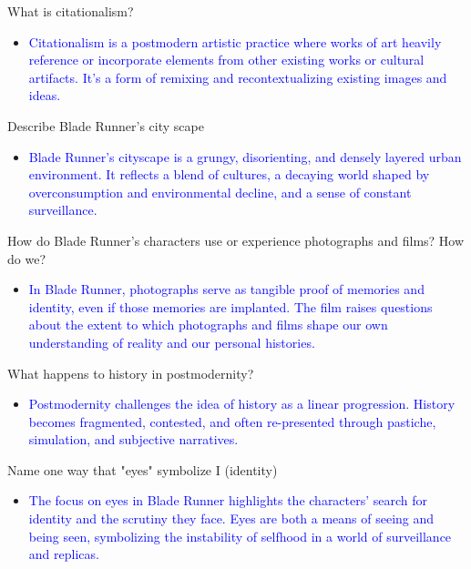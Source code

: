 \documentclass[11pt,fleqn]{book}
\begin{document}
\begin{exercise}
What is citationalism?
\begin{itemize}
    \item \textcolor{blue}{Citationalism is a postmodern artistic practice where works of art heavily reference or incorporate elements from other existing works or cultural artifacts. It's a form of remixing and recontextualizing existing images and ideas.}
\end{itemize}
\end{exercise}

\begin{exercise}
Describe Blade Runner's city scape
\begin{itemize}
\item \textcolor{blue}{Blade Runner's cityscape is a grungy, disorienting, and densely layered urban environment. It reflects a blend of cultures,  a decaying world shaped by overconsumption and environmental decline, and a sense of constant surveillance. }
\end{itemize}
\end{exercise}

\begin{exercise}
How do Blade Runner's characters use or experience photographs and films? How do we?
\begin{itemize}
\item \textcolor{blue}{In Blade Runner, photographs serve as tangible proof of memories and identity, even if those memories are implanted. The film raises questions about the extent to which photographs and films shape our own understanding of reality and our personal histories. }
\end{itemize}
\end{exercise}

\begin{exercise}
What happens to history in postmodernity?
\begin{itemize}
\item \textcolor{blue}{Postmodernity challenges the idea of history as a linear progression. History becomes fragmented, contested, and often re-presented through pastiche, simulation, and subjective narratives.}
\end{itemize}
\end{exercise}

\begin{exercise}
Name one way that "eyes" symbolize I (identity)
\begin{itemize}
    \item \textcolor{blue}{The focus on eyes in Blade Runner highlights the characters' search for identity and the scrutiny they face. Eyes are both a means of seeing and being seen, symbolizing the instability of selfhood in a world of surveillance and replicas.}
\end{itemize}
\end{exercise}
\end{document}
